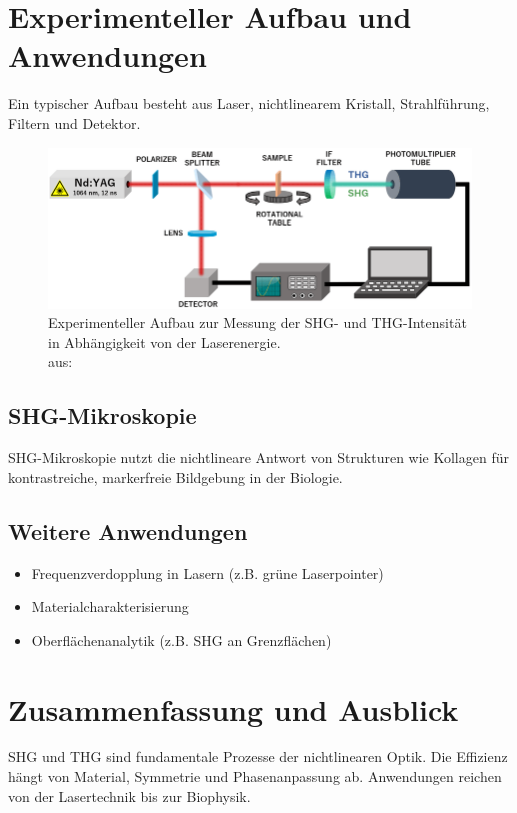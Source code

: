 \documentclass[9pt,a4paper,twocolumn,twoside]{tau-class/tau}
\newcommand{\figciteweburl}[1]{\\[0mm]{\tiny aus: \citeauthortitleurl{#1}}}
\begin{document}

\section{Experimenteller Aufbau und Anwendungen}
Ein typischer Aufbau besteht aus Laser, nichtlinearem Kristall, Strahlführung, Filtern und Detektor.

\begin{figure}[!ht]
\centering
\includegraphics[width=0.95\columnwidth]{../praes/Images/Experimental-setup-measuring-SHG-and-THG-intensity-relative-to-laser-energy.png}
\caption{Experimenteller Aufbau zur Messung der SHG- und THG-Intensität in Abhängigkeit von der Laserenergie.\figciteweburl{ResearchGate2025}}
\end{figure}

\subsection{SHG-Mikroskopie}
SHG-Mikroskopie nutzt die nichtlineare Antwort von Strukturen wie Kollagen für kontrastreiche, markerfreie Bildgebung in der Biologie.

\subsection{Weitere Anwendungen}
\begin{itemize}
    \item Frequenzverdopplung in Lasern (z.B. grüne Laserpointer)
    \item Materialcharakterisierung
    \item Oberflächenanalytik (z.B. SHG an Grenzflächen)
\end{itemize}


\section{Zusammenfassung und Ausblick}
SHG und THG sind fundamentale Prozesse der nichtlinearen Optik. Die Effizienz hängt von Material, Symmetrie und Phasenanpassung ab. Anwendungen reichen von der Lasertechnik bis zur Biophysik.
\end{document}
